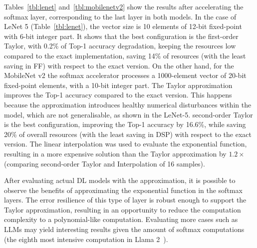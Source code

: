 \documentclass[conference]{IEEEtran}
\begin{document}
Tables~\ref{tbl:lenet} and~\ref{tbl:mobilenetv2} show the results after accelerating the softmax layer, corresponding to the last layer in both models. In the case of LeNet 5 (Table~\ref{tbl:lenet}), the vector size is 10 elements of 12-bit fixed-point with 6-bit integer part. It shows that the best configuration is the first-order Taylor, with 0.2\% of Top-1 accuracy degradation, keeping the resources low compared to the exact implementation, saving 14\% of resources (with the least saving in FF) with respect to the exact version. On the other hand, for the MobileNet v2 the softmax accelerator processes a 1000-element vector of 20-bit fixed-point elements, with a 10-bit integer part. The Taylor approximation improves the Top-1 accuracy compared to the exact version. This happens because the approximation introduces healthy numerical disturbances within the model, which are not generalisable, as shown in the LeNet-5. second-order Taylor is the best configuration, improving the Top-1 accuracy by 16.6\%, while saving 20\% of overall resources (with the least saving in DSP) with respect to the exact version. The linear interpolation was used to evaluate the exponential function, resulting in a more expensive solution than the Taylor approximation by $1.2\times$ (comparing second-order Taylor and Interpolation of 16 samples).

After evaluating actual DL models with the approximation, it is possible to observe the benefits of approximating the exponential function in the softmax layers. The error resilience of this type of layer is robust enough to support the Taylor approximation, resulting in an opportunity to reduce the computation complexity to a polynomial-like computation. Evaluating more cases such as LLMs may yield interesting results given the amount of softmax computations (the eighth most intensive computation in Llama 2~\cite{llm-ecaslab}).
\end{document}
